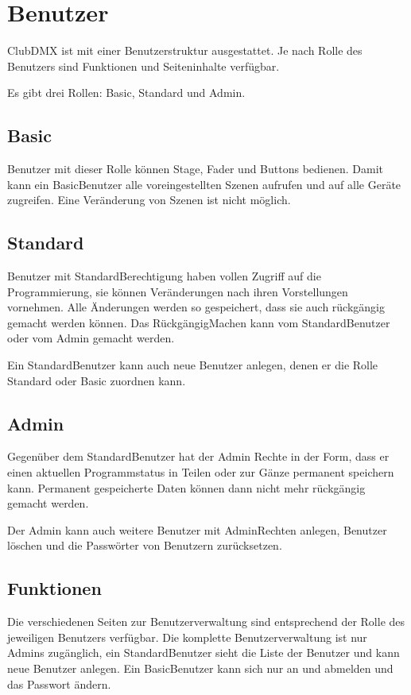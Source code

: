 \documentclass[letterpaper,10pt,ngerman]{sphinxmanual}
\begin{document}
\chapter{Benutzer}
\label{\detokenize{benutzer:benutzer}}\label{\detokenize{benutzer:benutzer-label}}\label{\detokenize{benutzer::doc}}
ClubDMX ist mit einer Benutzerstruktur ausgestattet. Je nach Rolle des
Benutzers sind Funktionen und Seiteninhalte verfügbar.

Es gibt drei Rollen: Basic, Standard und Admin.


\section{Basic}
\label{\detokenize{benutzer:basic}}
Benutzer mit dieser Rolle können Stage, Fader und Buttons bedienen. Damit
kann ein Basic\sphinxhyphen{}Benutzer alle voreingestellten Szenen aufrufen und auf
alle Geräte zugreifen. Eine Veränderung von Szenen ist nicht möglich.


\section{Standard}
\label{\detokenize{benutzer:standard}}
Benutzer mit Standard\sphinxhyphen{}Berechtigung haben vollen Zugriff auf die Programmierung,
sie können Veränderungen nach ihren Vorstellungen vornehmen. Alle
Änderungen werden so gespeichert, dass sie auch rückgängig gemacht
werden können. Das Rückgängig\sphinxhyphen{}Machen kann vom Standard\sphinxhyphen{}Benutzer oder vom
Admin gemacht werden.

Ein Standard\sphinxhyphen{}Benutzer kann auch neue Benutzer anlegen, denen er die Rolle
Standard oder Basic zuordnen kann.


\section{Admin}
\label{\detokenize{benutzer:admin}}
Gegenüber dem Standard\sphinxhyphen{}Benutzer hat der Admin Rechte in der
Form, dass er einen aktuellen Programmstatus in Teilen oder zur Gänze
permanent speichern kann. Permanent gespeicherte Daten können dann nicht
mehr rückgängig gemacht werden.

Der Admin kann auch weitere Benutzer mit Admin\sphinxhyphen{}Rechten anlegen, Benutzer
löschen und die Passwörter von Benutzern zurücksetzen.


\section{Funktionen}
\label{\detokenize{benutzer:funktionen}}
Die verschiedenen Seiten zur Benutzerverwaltung sind entsprechend der Rolle des
jeweiligen Benutzers verfügbar. Die komplette Benutzerverwaltung ist nur
Admins zugänglich, ein Standard\sphinxhyphen{}Benutzer sieht die Liste der Benutzer und
kann neue Benutzer anlegen. Ein Basic\sphinxhyphen{}Benutzer kann sich nur an\sphinxhyphen{} und abmelden
und das Passwort ändern.
\end{document}
